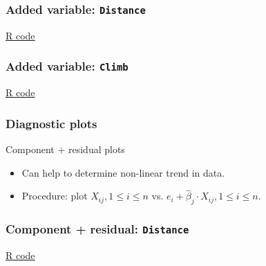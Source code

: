 \documentclass[handout]{beamer}
\begin{document}


   \begin{frame}
   \frametitle{Added variable: {\tt Distance}}
   \begin{center}
   \end{center}
   \href{http://stats191.stanford.edu/diagnostics.html#added-variable-plots}{R code}
   \end{frame}



   \begin{frame}
   \frametitle{Added variable: {\tt Climb}}
   \begin{center}
   \end{center}
   \href{http://stats191.stanford.edu/diagnostics.html#added-variable-plots}{R code}
   \end{frame}


   \begin{frame} \frametitle{Diagnostic plots}

   \begin{block}
   {Component + residual plots}
   \begin{itemize}
   \item Can help to determine non-linear trend in data.


   \item Procedure: plot $X_{ij}, 1 \leq i \leq n$ vs. $e_i + \widehat{\beta}_j \cdot X_{ij} , 1 \leq i \leq n$.

   \end{itemize}
   \end{block}
   \end{frame}



   \begin{frame}
   \frametitle{Component + residual: {\tt Distance}}
   \begin{center}
   \end{center}
   \href{http://stats191.stanford.edu/diagnostics.html#component-residual-plots}{R code}
   \end{frame}
\end{document}
